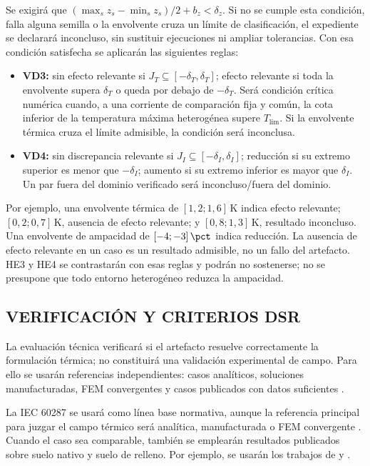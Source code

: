 Se exigirá que $(\max_s z_s-\min_s z_s)/2+b_z<\delta_z$. Si no se cumple esta condición, falla alguna semilla o la envolvente cruza un límite de clasificación, el expediente se declarará inconcluso, sin sustituir ejecuciones ni ampliar tolerancias. Con esa condición satisfecha se aplicarán las siguientes reglas:
\begin{itemize}
  \item \textbf{VD3:} sin efecto relevante si $J_T\subseteq[-\delta_T,\delta_T]$; efecto relevante si toda la envolvente supera $\delta_T$ o queda por debajo de $-\delta_T$. Será condición crítica numérica cuando, a una corriente de comparación fija y común, la cota inferior de la temperatura máxima heterogénea supere $T_{\mathrm{lim}}$. Si la envolvente térmica cruza el límite admisible, la condición será inconclusa.
  \item \textbf{VD4:} sin discrepancia relevante si $J_I\subseteq[-\delta_I,\delta_I]$; reducción si su extremo superior es menor que $-\delta_I$; aumento si su extremo inferior es mayor que $\delta_I$. Un par fuera del dominio verificado será inconcluso/fuera del dominio.
\end{itemize}

Por ejemplo, una envolvente térmica de $[1{,}2;1{,}6]\,\mathrm{K}$ indica efecto relevante; $[0{,}2;0{,}7]\,\mathrm{K}$, ausencia de efecto relevante; y $[0{,}8;1{,}3]\,\mathrm{K}$, resultado inconcluso. Una envolvente de ampacidad de $[-4;-3]\,\pct$ indica reducción. La ausencia de efecto relevante en un caso es un resultado admisible, no un fallo del artefacto. HE3 y HE4 se contrastarán con esas reglas y podrán no sostenerse; no se presupone que todo entorno heterogéneo reduzca la ampacidad.

\subsection{VERIFICACIÓN Y CRITERIOS DSR}
\label{subsec:verificacion-dsr}

La evaluación técnica verificará si el artefacto resuelve correctamente la formulación térmica; no constituirá una validación experimental de campo. Para ello se usarán referencias independientes: casos analíticos, soluciones manufacturadas, FEM convergentes y casos publicados con datos suficientes \parencite[3--4,93--99]{cigre2025}.

La IEC 60287 se usará como línea base normativa, aunque la referencia principal para juzgar el campo térmico será analítica, manufacturada o FEM convergente \parencite[3--4,93--99]{cigre2025}. Cuando el caso sea comparable, también se emplearán resultados publicados sobre suelo nativo y suelo de relleno. Por ejemplo, se usarán los trabajos de \textcite[1,6--7]{khumalo2025} y \textcite[9--10,16]{kim2025}.

